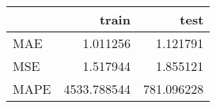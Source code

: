 \begin{tabular}{lrr}
\toprule
{} &        train &        test \\
\midrule
MAE  &     1.011256 &    1.121791 \\
MSE  &     1.517944 &    1.855121 \\
MAPE &  4533.788544 &  781.096228 \\
\bottomrule
\end{tabular}
